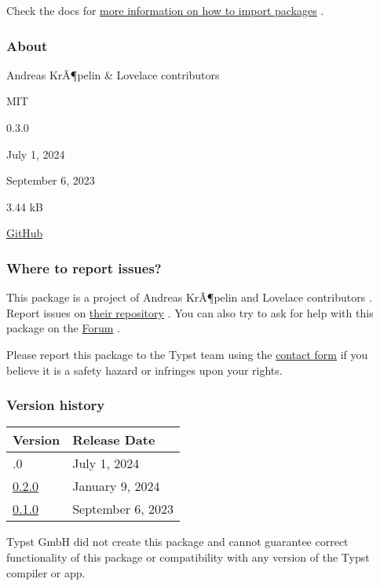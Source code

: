 

Check the docs for
\href{https://typst.app/docs/reference/scripting/\#packages}{more
information on how to import packages} .

\subsubsection{About}\label{about}

\begin{description}
\tightlist
\item[Author s :]
Andreas KrÃ¶pelin \& Lovelace contributors
\item[License:]
MIT
\item[Current version:]
0.3.0
\item[Last updated:]
July 1, 2024
\item[First released:]
September 6, 2023
\item[Archive size:]
3.44 kB
\href{https://packages.typst.org/preview/lovelace-0.3.0.tar.gz}{\pandocbounded{}}
\item[Repository:]
\href{https://github.com/andreasKroepelin/lovelace}{GitHub}
\end{description}

\subsubsection{Where to report issues?}\label{where-to-report-issues}

This package is a project of Andreas KrÃ¶pelin and Lovelace contributors
. Report issues on
\href{https://github.com/andreasKroepelin/lovelace}{their repository} .
You can also try to ask for help with this package on the
\href{https://forum.typst.app}{Forum} .

Please report this package to the Typst team using the
\href{https://typst.app/contact}{contact form} if you believe it is a
safety hazard or infringes upon your rights.

\label{versions}
\subsubsection{Version history}\label{version-history}

\begin{longtable}[]{@{}ll@{}}
\toprule\noalign{}
Version & Release Date \\
\midrule\noalign{}
\endhead
\bottomrule\noalign{}
\endlastfoot
0.3.0 & July 1, 2024 \\
\href{https://typst.app/universe/package/lovelace/0.2.0/}{0.2.0} &
January 9, 2024 \\
\href{https://typst.app/universe/package/lovelace/0.1.0/}{0.1.0} &
September 6, 2023 \\
\end{longtable}

Typst GmbH did not create this package and cannot guarantee correct
functionality of this package or compatibility with any version of the
Typst compiler or app.
